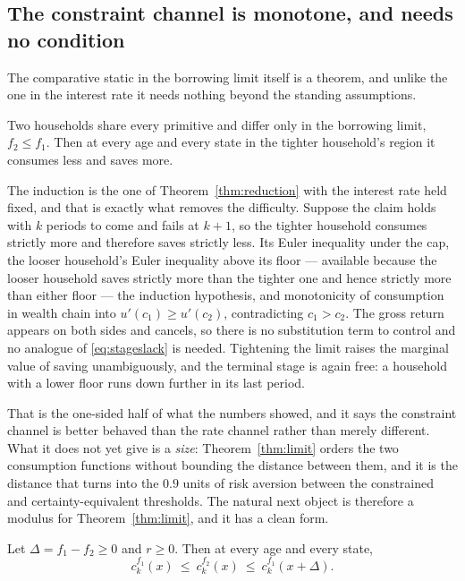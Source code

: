 \subsection{The constraint channel is monotone, and needs no condition}

The comparative static in the borrowing limit itself is a theorem, and unlike the one in the
interest rate it needs nothing beyond the standing assumptions.

\begin{theorem}\label{thm:limit}
Two households share every primitive and differ only in the borrowing limit, $f_2\le f_1$. Then at
every age and every state in the tighter household's region it consumes less and saves more.
\end{theorem}

The induction is the one of Theorem~\ref{thm:reduction} with the interest rate held fixed, and
that is exactly what removes the difficulty. Suppose the claim holds with $k$ periods to come and
fails at $k+1$, so the tighter household consumes strictly more and therefore saves strictly less.
Its Euler inequality under the cap, the looser household's Euler inequality above its floor ---
available because the looser household saves strictly more than the tighter one and hence strictly
more than either floor --- the induction hypothesis, and monotonicity of consumption in wealth
chain into $u'(c_1)\ge u'(c_2)$, contradicting $c_1>c_2$. The gross return appears on both sides
and cancels, so there is no substitution term to control and no analogue of
\eqref{eq:stageslack} is needed. Tightening the limit raises the marginal value of saving
unambiguously, and the terminal stage is again free: a household with a lower floor runs down
further in its last period.

That is the one-sided half of what the numbers showed, and it says the constraint channel is
better behaved than the rate channel rather than merely different. What it does not yet give is a
\emph{size}: Theorem~\ref{thm:limit} orders the two consumption functions without bounding the
distance between them, and it is the distance that turns into the $0.9$ units of risk aversion
between the constrained and certainty-equivalent thresholds. The natural next object is therefore
a modulus for Theorem~\ref{thm:limit}, and it has a clean form.

\begin{theorem}
\label{thm:modulus}
Let $\Delta=f_1-f_2\ge0$ and $r\ge0$. Then at every age and every state,
\[
  c^{f_1}_k(x)\ \le\ c^{f_2}_k(x)\ \le\ c^{f_1}_k(x+\Delta) .
\]
\end{theorem}

